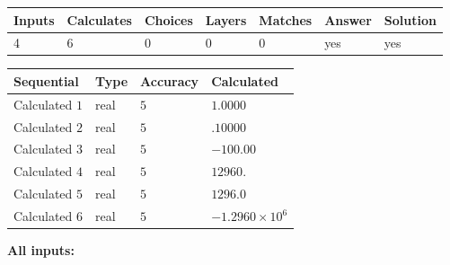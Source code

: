 \documentclass[12pt]{article}
\begin{document}
   
\noindent\begin{tabular}{|l|l|l|l|l|l|l|}
 \hline
Inputs & Calculates & Choices & Layers & Matches & Answer & Solution \\ \hline
           4 & 
           6 & 
           0
  & 
           0 & 
           0 & 
  yes & 
  yes 
  \\ \hline
 \end{tabular}
   
   
   
   
\noindent{}
   
   
  
  
\noindent\begin{tabular}{|l|l|l|l|}
\hline
 Sequential & Type & Accuracy & Calculated \\ 
\hline
 
 
  Calculated $           1$ & real & $           5 $ & 
 $ 1.0000 $ 
 \\  \hline  
 
 
  Calculated $           2$ & real & $           5 $ & 
 $ .10000 $ 
 \\  \hline  
 
 
  Calculated $           3$ & real & $           5 $ & 
 $ -100.00 $ 
 \\  \hline  
 
 
  Calculated $           4$ & real & $           5 $ & 
 $ 12960. $ 
 \\  \hline  
 
 
  Calculated $           5$ & real & $           5 $ & 
 $ 1296.0 $ 
 \\  \hline  
 
 
  Calculated $           6$ & real & $           5 $ & 
 $ -1.2960 \times 10^{6} $ 
 \\  \hline  
 \end{tabular}
   
   
   
   
\noindent\vspace{0.1in}\hspace{-0.08in} {\textbf{\Large{All inputs: }}}
   
   
  
\end{document}
